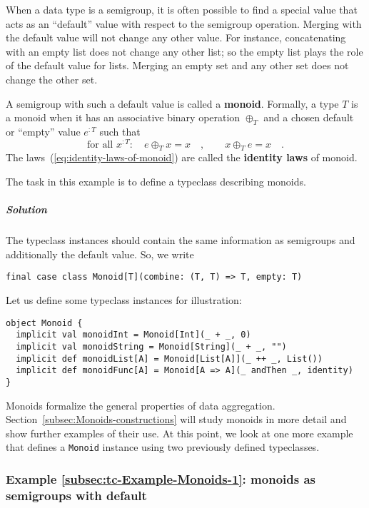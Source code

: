 When a data type is a semigroup, it is often possible to find a special
value that acts as an ``default'' value with respect to the semigroup
operation. Merging with the default value will not change any other
value. For instance, concatenating with an empty list does not change
any other list; so the empty list plays the role of the default value
for lists. Merging an empty set and any other set does not change
the other set.

A semigroup with such a default value is called a \textbf{monoid}.
Formally, a type $T$ is a monoid when it has an associative binary
operation $\oplus_{T}$ and a chosen default or ``empty'' value
$e^{:T}$ such that 
\begin{equation}
\text{for all }x^{:T}:\quad e\oplus_{T}x=x\quad,\quad\quad x\oplus_{T}e=x\quad.\label{eq:identity-laws-of-monoid}
\end{equation}
The laws~(\ref{eq:identity-laws-of-monoid}) are called the \textbf{identity
laws} of monoid. 

The task in this example is to define a typeclass describing monoids. 

\subparagraph{Solution}

The typeclass instances should contain the same information as semigroups
and additionally the default value. So, we write
\begin{lstlisting}
final case class Monoid[T](combine: (T, T) => T, empty: T)
\end{lstlisting}
Let us define some typeclass instances for illustration:
\begin{lstlisting}
object Monoid {
  implicit val monoidInt = Monoid[Int](_ + _, 0)
  implicit val monoidString = Monoid[String](_ + _, "")
  implicit def monoidList[A] = Monoid[List[A]](_ ++ _, List())
  implicit def monoidFunc[A] = Monoid[A => A](_ andThen _, identity)
}
\end{lstlisting}

Monoids formalize the general properties of data aggregation. Section~\ref{subsec:Monoids-constructions}
will study monoids in more detail and show further examples of their
use. At this point, we look at one more example that defines a \lstinline!Monoid!
instance using two previously defined typeclasses.

\subsubsection{Example \label{subsec:tc-Example-Monoids-1}\ref{subsec:tc-Example-Monoids-1}:
monoids as semigroups with default}

